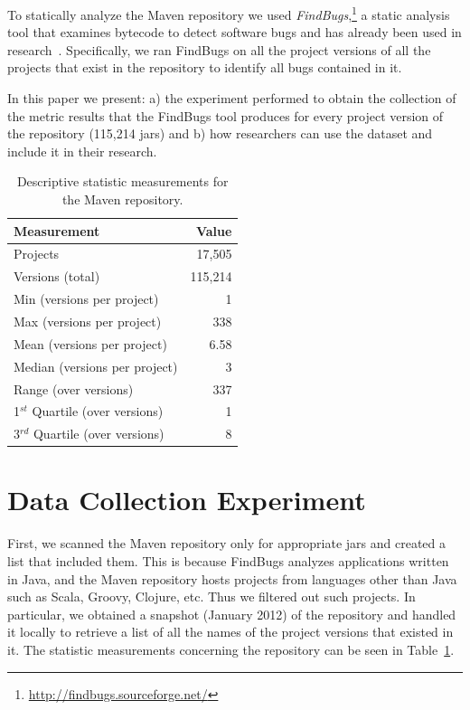 \documentclass{sig-alternate}
\begin{document}
To statically analyze the Maven repository
we used {\it FindBugs},\footnote{\url{http://findbugs.sourceforge.net/}}
a static analysis tool that examines bytecode to detect software bugs
and has already been used in research~\cite{AP10,SHP06}.
Specifically, we ran FindBugs on all the project versions of all
the projects that exist in the repository
to identify all bugs contained in it.

In this paper we present: a) the experiment performed to obtain the
collection of the metric results that the FindBugs tool produces 
for every project version of the repository (115,214 {\sc jar}s)
and b) how researchers can use the dataset and include it in their research.

\begin{table}
\centering
\begin{tabular}{l r}
\hline
Measurement & Value\\
 \hline
Projects & 17,505\\
Versions (total) & 115,214\\
Min (versions per project) & 1\\
Max (versions per project) & 338\\
Mean (versions per project) & 6.58\\
Median (versions per project) & 3\\
Range (over versions) & 337\\
1$^{st}$ Quartile (over versions) & 1\\
3$^{rd}$ Quartile (over versions) & 8\\
\hline
\end{tabular}
\caption{Descriptive statistic measurements for the Maven repository.}
\label{tbl:repository}
\end{table}

\section{Data Collection Experiment}
\label{sec:exp}

First, we scanned the Maven repository only
for appropriate {\sc jar}s and created a list that included them.
This is because FindBugs analyzes applications written in Java,
and the Maven repository hosts projects from
languages other than Java such as Scala, Groovy,
Clojure, etc. Thus we filtered out such projects.
In particular, we obtained a snapshot (January 2012) of
the repository and handled it locally to retrieve a list of all
the names of the project versions that existed in it.
The statistic measurements concerning the repository can be seen in 
Table~\ref{tbl:repository}.
\end{document}
